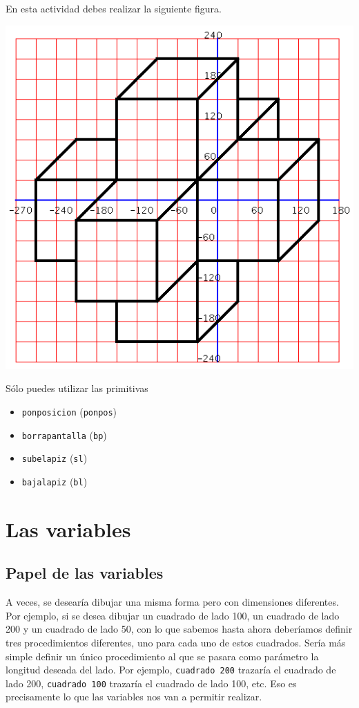 \documentclass[12pt,twoside,spanish,a4paper]{report}
\begin{document}
% 
En esta actividad debes realizar la siguiente figura.
\begin{center}
   \includegraphics[scale=0.5]{Imagenes_Tutorial/06_Policubo.png}
\end{center}
S\'olo puedes utilizar las primitivas
\begin{itemize}
   \item \texttt{ponposicion} (\texttt{ponpos})
   \item \texttt{borrapantalla} (\texttt{bp})
   \item \texttt{subelapiz} (\texttt{sl})
   \item \texttt{bajalapiz} (\texttt{bl})
\end{itemize}

\newpage{}

\chapter{Las variables}
   \label{sec:Las-variables}

\section{Papel de las variables}
   \label{sub:Papel-variables}

A veces, se desear\'ia dibujar una misma forma pero con dimensiones
diferentes. Por ejemplo, si se desea dibujar un cuadrado de lado 100,
un cuadrado de lado 200 y un cuadrado de lado 50, con lo que sabemos
hasta ahora deber\'iamos definir tres procedimientos diferentes, uno
para cada uno de estos cuadrados. Ser\'ia m\'as simple definir un \'unico
procedimiento al que se pasara como par\'ametro la longitud deseada
del lado. Por ejemplo, \texttt{cuadrado 200} trazar\'ia el cuadrado
de lado 200, \texttt{cuadrado 100} trazar\'ia el cuadrado de lado 100,
etc. Eso es precisamente lo que las variables nos van a permitir realizar.
\end{document}
